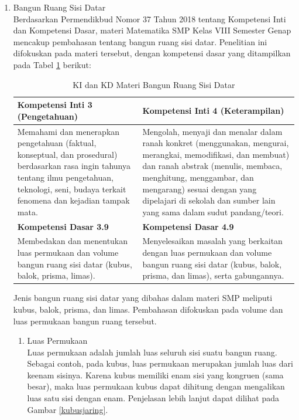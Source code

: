 \begin{enumerate}
    \item Bangun Ruang Sisi Datar\\
    \hspace*{1cm}Berdasarkan Permendikbud Nomor 37 Tahun 2018 tentang Kompetensi Inti dan Kompetensi Dasar, materi Matematika SMP Kelas VIII Semester Genap mencakup pembahasan tentang bangun ruang sisi datar. Penelitian ini difokuskan pada materi tersebut, dengan kompetensi dasar yang ditampilkan pada Tabel \ref{kikd} berikut:
    \begin{table}[H]
        \centering
        \caption{KI dan KD Materi Bangun Ruang Sisi Datar}
        \label{kikd}
        \begin{tabular}{|p{7cm}|p{7cm}|}
            \hline
            \textbf{Kompetensi Inti 3 (Pengetahuan)} & \textbf{Kompetensi Inti 4 (Keterampilan)} \\
            \hline
            Memahami dan menerapkan pengetahuan (faktual, konseptual, dan prosedural) berdasarkan rasa ingin tahunya tentang ilmu pengetahuan, teknologi, seni, budaya terkait fenomena dan kejadian tampak mata. &
            Mengolah, menyaji dan menalar dalam ranah konkret (menggunakan, mengurai, merangkai, memodifikasi, dan membuat) dan ranah abstrak (menulis, membaca, menghitung, menggambar, dan mengarang) sesuai dengan yang dipelajari di sekolah dan sumber lain yang sama dalam sudut pandang/teori. \\
            \hline
            \textbf{Kompetensi Dasar 3.9} & \textbf{Kompetensi Dasar 4.9}\\
            \hline
            Membedakan dan menentukan luas permukaan dan volume bangun ruang sisi datar (kubus, balok, prisma, limas). & Menyelesaikan masalah yang berkaitan dengan luas permukaan dan volume bangun ruang sisi datar (kubus, balok, prisma, dan limas), serta gabungannya.\\
            \hline
        \end{tabular}
    \end{table}
    \hspace*{1cm}Jenis bangun ruang sisi datar yang dibahas dalam materi SMP meliputi kubus, balok, prisma, dan limas. Pembahasan difokuskan pada volume dan luas permukaan bangun ruang tersebut.
    \begin{enumerate}
        \item Luas Permukaan\\
        \hspace*{1cm}Luas permukaan adalah jumlah luas seluruh sisi suatu bangun ruang. Sebagai contoh, pada kubus, luas permukaan merupakan jumlah luas dari keenam sisinya. Karena kubus memiliki enam sisi yang kongruen (sama besar), maka luas permukaan kubus dapat dihitung dengan mengalikan luas satu sisi dengan enam. Penjelasan lebih lanjut dapat dilihat pada Gambar \ref{kubusjaring}.

\end{enumerate}
\end{enumerate}

